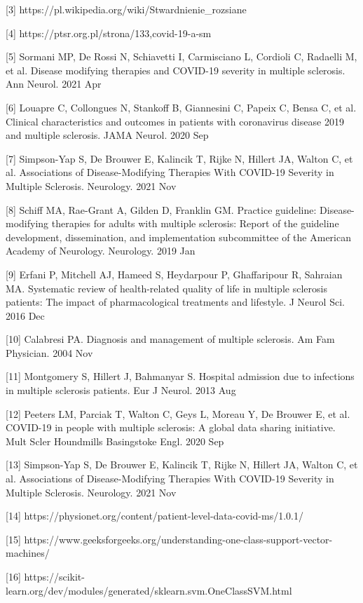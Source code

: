 \documentclass[a4paper,fleqn]{cas-dc}
\begin{document}
[3] https://pl.wikipedia.org/wiki/Stwardnienie\_rozsiane

[4] https://ptsr.org.pl/strona/133,covid-19-a-sm

[5] Sormani MP, De Rossi N, Schiavetti I, Carmisciano L, Cordioli C, Radaelli M, et al. Disease modifying therapies and COVID-19 severity in multiple sclerosis. Ann Neurol. 2021 Apr

[6] Louapre C, Collongues N, Stankoff B, Giannesini C, Papeix C, Bensa C, et al. Clinical characteristics and outcomes in patients with coronavirus disease 2019 and multiple sclerosis. JAMA Neurol. 2020 Sep

[7] Simpson-Yap S, De Brouwer E, Kalincik T, Rijke N, Hillert JA, Walton C, et al. Associations of Disease-Modifying Therapies With COVID-19 Severity in Multiple Sclerosis. Neurology. 2021 Nov

[8] Schiff MA, Rae-Grant A, Gilden D, Franklin GM. Practice guideline: Disease-modifying therapies for adults with multiple sclerosis: Report of the guideline development, dissemination, and implementation subcommittee of the American Academy of Neurology. Neurology. 2019 Jan

[9] Erfani P, Mitchell AJ, Hameed S, Heydarpour P, Ghaffaripour R, Sahraian MA. Systematic review of health-related quality of life in multiple sclerosis patients: The impact of pharmacological treatments and lifestyle. J Neurol Sci. 2016 Dec

[10] Calabresi PA. Diagnosis and management of multiple sclerosis. Am Fam Physician. 2004 Nov

[11] Montgomery S, Hillert J, Bahmanyar S. Hospital admission due to infections in multiple sclerosis patients. Eur J Neurol. 2013 Aug

[12] Peeters LM, Parciak T, Walton C, Geys L, Moreau Y, De Brouwer E, et al. COVID-19 in people with multiple sclerosis: A global data sharing initiative. Mult Scler Houndmills Basingstoke Engl. 2020 Sep

[13] Simpson-Yap S, De Brouwer E, Kalincik T, Rijke N, Hillert JA, Walton C, et al. Associations of Disease-Modifying Therapies With COVID-19 Severity in Multiple Sclerosis. 
Neurology. 2021 Nov

[14] https://physionet.org/content/patient-level-data-covid-ms/1.0.1/

[15] https://www.geeksforgeeks.org/understanding-one-class-support-vector-machines/

[16] https://scikit-learn.org/dev/modules/generated/sklearn.svm.OneClassSVM.html
\end{document}
